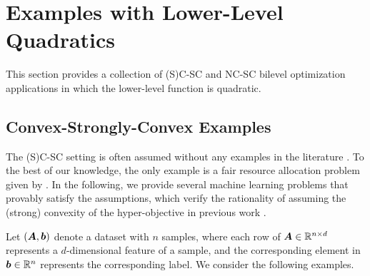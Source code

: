 

\section{Examples with Lower-Level Quadratics} \label{apx:example-Q}

This section provides a collection of (S)C-SC and NC-SC bilevel optimization applications in which the lower-level function is quadratic. 

\subsection{Convex-Strongly-Convex Examples} \label{apx:exmple-C-SC}
The (S)C-SC setting is often assumed without any examples in the literature \citep{ghadimi2018approximation,hong2023two}. To the best of our knowledge, the only example is a fair resource allocation problem~\citep{srikant2014communication} given by \citet{ji2023lower}. In the following, we provide several machine learning problems that provably satisfy the assumptions, which verify the rationality of assuming the (strong) convexity of the hyper-objective in previous work \citep{ghadimi2018approximation,hong2023two}.

Let $({\bm{A}},{\bm{b}})$ denote a dataset with $n$ samples, where each row of ${\bm{A}} \in {\mathbb{R}}^{n \times d}$ represents a $d$-dimensional feature of a sample, and the corresponding element in ${\bm{b}} \in {\mathbb{R}}^n$ represents the corresponding label. We consider the following examples.

